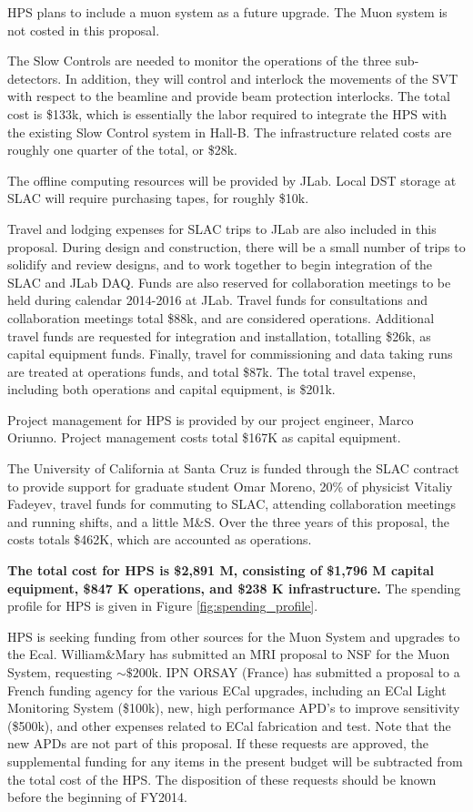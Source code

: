 HPS plans to include a muon system as a future upgrade. The Muon system is not costed in this proposal.

The Slow Controls are needed to monitor the operations of the three sub-detectors. In addition, they will control and interlock the 
movements of the SVT with respect to the beamline and provide beam protection interlocks. The total cost is \$133k, which is essentially 
the labor required to integrate the HPS with the existing Slow Control system in Hall-B. The infrastructure related costs are roughly
one quarter of the total, or \$28k.

The offline computing resources will be provided by JLab. Local DST storage at SLAC will require purchasing tapes, for roughly \$10k. 

Travel and lodging expenses for SLAC trips to JLab are also included in this proposal. During design and construction, 
there will be a small number of trips to solidify and review designs, and to work together to begin integration of the SLAC 
and JLab DAQ. Funds are also reserved for collaboration meetings to be held during calendar 2014-2016 at JLab. Travel funds for
consultations and collaboration meetings total \$88k, and are considered operations. Additional travel funds are requested for integration 
and installation, totalling \$26k, as capital equipment funds. Finally, travel for commissioning and data taking runs are treated at operations 
funds, and total \$87k. The total travel expense, including both operations and capital equipment, is \$201k.

Project management for HPS is provided by our project engineer, Marco Oriunno. Project management costs total \$167K as capital equipment.

The University of California at Santa Cruz is funded through the SLAC contract to provide support for graduate student Omar Moreno, 20\% of physicist
Vitaliy Fadeyev, travel funds for commuting to SLAC, attending collaboration meetings and running shifts, and a little M\&S. Over the three
years of this proposal, the costs totals \$462K, which are accounted as operations.


{\bf The total cost for HPS is \$2,891 M, consisting of \$1,796 M capital equipment, \$847 K operations, and \$238 K infrastructure. }
The spending profile for HPS is given in Figure \ref{fig:spending_profile}.

HPS is seeking funding from other sources for the Muon System and upgrades to the Ecal.
William\&Mary has submitted an MRI proposal to NSF for the Muon System, requesting $\sim \$200$k. IPN ORSAY (France) 
has submitted a proposal to a French funding agency for the various ECal upgrades, including an ECal Light Monitoring System (\$100k), new, 
high performance  APD's to improve sensitivity (\$500k), and other expenses related to ECal fabrication and test.
Note that the new APDs are not part of this proposal. If these requests are approved, the supplemental funding for any items in the present 
budget will be subtracted from the total cost of the HPS. The disposition of these requests should be known before the beginning of FY2014.

